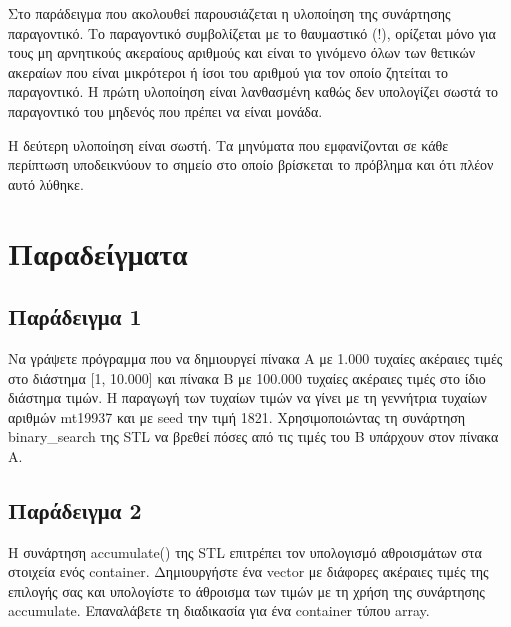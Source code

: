 Στο παράδειγμα που ακολουθεί παρουσιάζεται η υλοποίηση της συνάρτησης παραγοντικό. Το παραγοντικό συμβολίζεται με το θαυμαστικό (!), ορίζεται μόνο για τους μη αρνητικούς ακεραίους αριθμούς και είναι το γινόμενο όλων των θετικών ακεραίων που είναι μικρότεροι ή ίσοι του αριθμού για τον οποίο ζητείται το παραγοντικό. Η πρώτη υλοποίηση είναι λανθασμένη καθώς δεν υπολογίζει σωστά το παραγοντικό του μηδενός που πρέπει να είναι μονάδα. 





Η δεύτερη υλοποίηση είναι σωστή. Τα μηνύματα που εμφανίζονται σε κάθε περίπτωση υποδεικνύουν το σημείο στο οποίο βρίσκεται το πρόβλημα και ότι πλέον αυτό λύθηκε.






\section{Παραδείγματα}
\subsection{Παράδειγμα 1}
Να γράψετε πρόγραμμα που να δημιουργεί πίνακα Α με 1.000 τυχαίες ακέραιες τιμές στο διάστημα [1, 10.000] και πίνακα Β με 100.000 τυχαίες ακέραιες τιμές στο ίδιο διάστημα τιμών. Η παραγωγή των τυχαίων τιμών να γίνει με τη γεννήτρια τυχαίων αριθμών mt19937 και με seed την τιμή 1821. Χρησιμοποιώντας τη συνάρτηση binary\_search της STL να βρεθεί πόσες από τις τιμές του Β υπάρχουν στον πίνακα Α.






\subsection{Παράδειγμα 2}
Η συνάρτηση accumulate() της STL επιτρέπει τον υπολογισμό αθροισμάτων στα στοιχεία ενός container. Δημιουργήστε ένα vector με διάφορες ακέραιες τιμές της επιλογής σας και υπολογίστε το άθροισμα των τιμών με τη χρήση της συνάρτησης accumulate. Επαναλάβετε τη διαδικασία για ένα container τύπου array.

